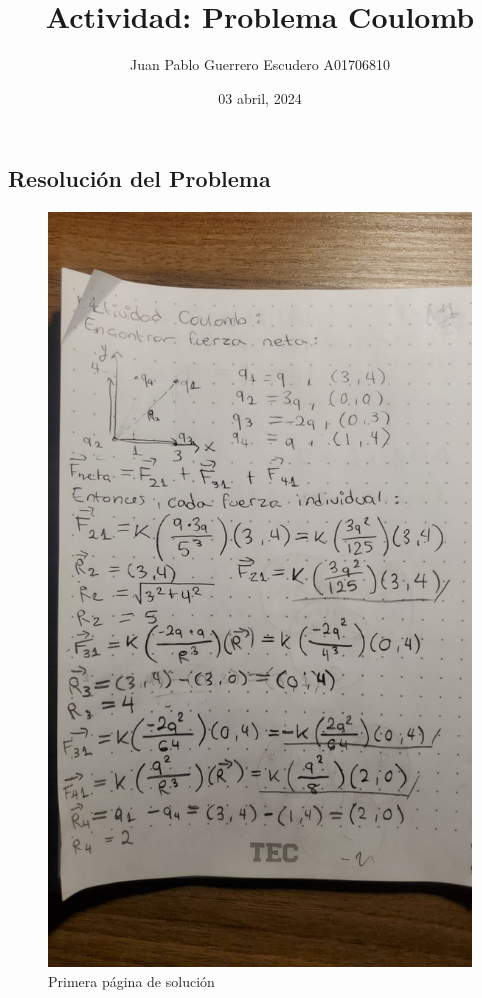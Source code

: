 \documentclass[12pt, letterpaper]{report}
\title{Actividad: Problema Coulomb}
\author{Juan Pablo Guerrero Escudero A01706810}
\date{03 abril, 2024}
\begin{document}
\maketitle
\subsection*{Resolución del Problema}
\begin{figure}[H]
    \centering
    \includegraphics[height = 20cm]{2024-04-03_ProblemaCoulomb_1.jpeg}
    \caption{Primera página de solución}
\end{figure}
\end{document}
